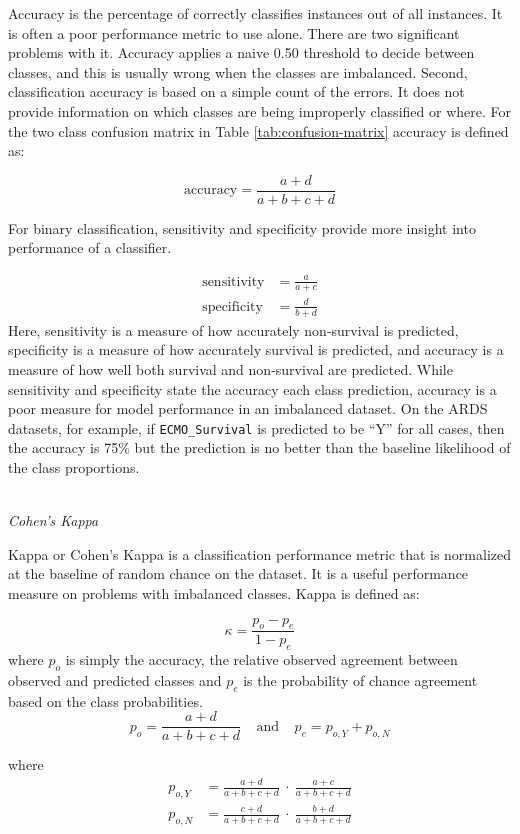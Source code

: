 \documentclass[12pt,]{article}
\begin{document}
Accuracy is the percentage of correctly classifies instances out of all
instances. It is often a poor performance metric to use alone. There are
two significant problems with it. Accuracy applies a naive 0.50
threshold to decide between classes, and this is usually wrong when the
classes are imbalanced. Second, classification accuracy is based on a
simple count of the errors. It does not provide information on which
classes are being improperly classified or where. For the two class
confusion matrix in Table \ref{tab:confusion-matrix} accuracy is defined
as:

\[
\text{accuracy} = \frac{a+d}{a+b+c+d}
\]

For binary classification, sensitivity and specificity provide more
insight into performance of a classifier.

\[
\begin{aligned}
\text{sensitivity} &= \frac{a}{a+c} \\
\text{specificity} &= \frac{d}{b+d}
\end{aligned}
\] Here, sensitivity is a measure of how accurately non-survival is
predicted, specificity is a measure of how accurately survival is
predicted, and accuracy is a measure of how well both survival and
non-survival are predicted. While sensitivity and specificity state the
accuracy each class prediction, accuracy is a poor measure for model
performance in an imbalanced dataset. On the ARDS datasets, for example,
if \texttt{ECMO\_Survival} is predicted to be ``Y'' for all cases, then
the accuracy is 75\% but the prediction is no better than the baseline
likelihood of the class proportions.

\(~\)\\
\emph{Cohen's Kappa}

Kappa or Cohen's Kappa \autocite{cohen_coefficient_1960} is a
classification performance metric that is normalized at the baseline of
random chance on the dataset. It is a useful performance measure on
problems with imbalanced classes. Kappa is defined as:

\[
\kappa = \frac{p_o - p_e}{1 - p_e}
\] where \(p_o\) is simply the accuracy, the relative observed agreement
between observed and predicted classes and \(p_e\) is the probability of
chance agreement based on the class probabilities. \[
p_o = \frac{a+d}{a+b+c+d}  ~~~~~\text{and}~~~~~ p_e = p_{o,Y} + p_{o,N} 
\]

where \[
\begin{aligned}
p_{o,Y} &= \frac{a+d}{a+b+c+d} ~\cdot~ \frac{a+c}{a+b+c+d} \\
p_{o,N} &= \frac{c+d}{a+b+c+d} ~\cdot~ \frac{b+d}{a+b+c+d}
\end{aligned}
\]
\end{document}
